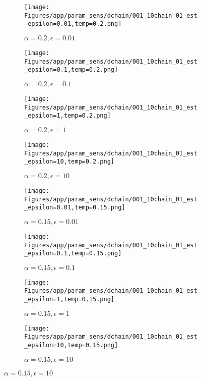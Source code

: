 \documentclass{article}
\theoremstyle{plain}
\begin{document}
\begin{appendices}
\begin{figure}
                \begin{subfigure}[b]{0.24\textwidth}
                    \centering
                    \texttt{[image: Figures/app/param\_sens/dchain/001\_10chain\_01\_est\_epsilon=0.01,temp=0.2.png]}
                    \caption*{$\alpha=0.2,\epsilon=0.01$}
                \end{subfigure}
                \begin{subfigure}[b]{0.24\textwidth}
                    \centering
                    \texttt{[image: Figures/app/param\_sens/dchain/001\_10chain\_01\_est\_epsilon=0.1,temp=0.2.png]}
                    \caption*{$\alpha=0.2,\epsilon=0.1$}
                \end{subfigure}
                \begin{subfigure}[b]{0.24\textwidth}
                    \centering
                    \texttt{[image: Figures/app/param\_sens/dchain/001\_10chain\_01\_est\_epsilon=1,temp=0.2.png]}
                    \caption*{$\alpha=0.2,\epsilon=1$}
                \end{subfigure}
                \begin{subfigure}[b]{0.24\textwidth}
                    \centering
                    \texttt{[image: Figures/app/param\_sens/dchain/001\_10chain\_01\_est\_epsilon=10,temp=0.2.png]}
                    \caption*{$\alpha=0.2,\epsilon=10$}
                \end{subfigure}
                
                \begin{subfigure}[b]{0.24\textwidth}
                    \centering
                    \texttt{[image: Figures/app/param\_sens/dchain/001\_10chain\_01\_est\_epsilon=0.01,temp=0.15.png]}
                    \caption*{$\alpha=0.15,\epsilon=0.01$}
                \end{subfigure}
                \begin{subfigure}[b]{0.24\textwidth}
                    \centering
                    \texttt{[image: Figures/app/param\_sens/dchain/001\_10chain\_01\_est\_epsilon=0.1,temp=0.15.png]}
                    \caption*{$\alpha=0.15,\epsilon=0.1$}
                \end{subfigure}
                \begin{subfigure}[b]{0.24\textwidth}
                    \centering
                    \texttt{[image: Figures/app/param\_sens/dchain/001\_10chain\_01\_est\_epsilon=1,temp=0.15.png]}
                    \caption*{$\alpha=0.15,\epsilon=1$}
                \end{subfigure}
                \begin{subfigure}[b]{0.24\textwidth}
                    \centering
                    \texttt{[image: Figures/app/param\_sens/dchain/001\_10chain\_01\_est\_epsilon=10,temp=0.15.png]}
                    \caption*{$\alpha=0.15,\epsilon=10$}
                \end{subfigure}
                

\end{figure}
\end{appendices}
\end{document}
